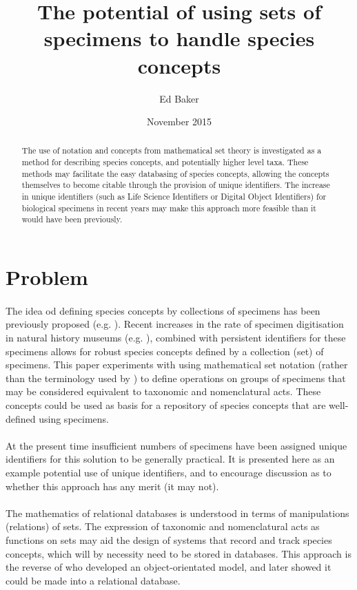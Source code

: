 \documentclass{article}
\title{The potential of using sets of specimens to handle species concepts}
\author{Ed Baker}
\date{November 2015}
\begin{document}
   \maketitle
   \begin{abstract}
   	The use of notation and concepts from mathematical set theory is investigated as a method for describing species concepts, and potentially higher level taxa. These methods may facilitate the easy databasing of species concepts, allowing the concepts themselves to become citable through the provision of unique identifiers. The increase in unique identifiers (such as Life Science Identifiers or Digital Object Identifiers) for biological specimens in recent years may make this approach more feasible than it would have been previously.
   \end{abstract}
   \tableofcontents
   \section{Problem}
   \paragraph{}
   The idea od defining species concepts by collections of specimens has been previously proposed (e.g. \cite{berendsohn1995}). Recent increases in the rate of specimen digitisation in natural history museums (e.g. \cite{blagoderov2012}), combined with persistent identifiers for these specimens \cite{guralnick2015} allows for robust species concepts defined by a collection (set) of specimens. This paper experiments with using mathematical set notation (rather than the terminology used by \cite{franz2009}) to define operations on groups of specimens that may be considered equivalent to taxonomic and nomenclatural acts. These concepts could be used as basis for a repository of species concepts that are well-defined using specimens.
   \paragraph{}
   At the present time insufficient numbers of specimens have been assigned unique identifiers for this solution to be generally practical. It is presented here as an example potential use of unique identifiers, and to encourage discussion as to whether this approach has any merit (it may not).
   \paragraph{}
   The mathematics of relational databases is understood in terms of manipulations (relations) of sets. The expression of taxonomic and nomenclatural acts as functions on sets may aid the design of systems that record and track species concepts, which will by necessity need to be stored in databases. This approach is the reverse of \cite{ytow2001} who developed an object-orientated model, and later showed it could be made into a relational database.
\end{document}

